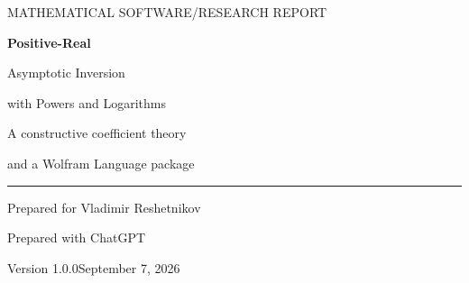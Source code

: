 \documentclass[11pt,a4paper]{article}
\theoremstyle{definition}
\theoremstyle{remark}
\begin{document}
\begin{titlepage}
\thispagestyle{empty}
\color{ink}
{\sffamily\small MATHEMATICAL SOFTWARE\enspace /\enspace RESEARCH REPORT}\par
\vspace{12mm}
{\Huge\bfseries Positive-Real\par Asymptotic Inversion\par}
\vspace{4mm}
{\LARGE with Powers and Logarithms\par}
\vspace{7mm}
{\large A constructive coefficient theory\par and a Wolfram Language package\par}
\vspace{8mm}
\noindent\color{ruleblue}\rule{\textwidth}{1pt}\color{ink}
\vspace{5mm}
{\large Prepared for Vladimir Reshetnikov\par}
{\normalsize Prepared with ChatGPT\par}
\vspace{3mm}
{\sffamily Version 1.0.0\enspace\textbullet\enspace September 7, 2026\par}
\vspace{10mm}
\begin{abstract}
\noindent We construct the positive real inverse near zero of
\[
 f(x)=a x^p\left(1+\sum_{j=1}^{m}x^{\delta_j}P_j(\log x)\right),
 \qquad a,p,\delta_j>0,
\]
where the $P_j$ are real polynomials and the gaps $\delta_j$ may be irrational.
A homotopy form of Lagrange--B\"urmann inversion produces every coefficient by a
finite product of first-order differential operators on polynomials. We prove
local existence, branch selection, convergence of the polynomial-block
expansion, formal uniqueness, and logarithm-aware remainder estimates for both
exponent and perturbation-depth truncation. The original examples
$x+x^2(1+\log x)$ and $x+x^{\sqrt2}$ are worked out to arbitrary order, with
explicit coefficients and convergence information. The accompanying package
normalizes admissible input, preserves exact irrational exponents, combines
coincident weights, and returns expressions together with error metadata.
\end{abstract}
\vfill
\noindent{}
\end{titlepage}
\end{document}

